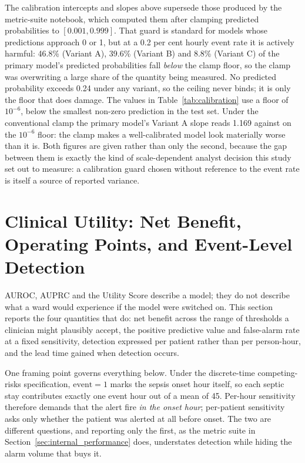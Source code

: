 The calibration intercepts and slopes above supersede those produced by the
metric-suite notebook, which computed them after clamping predicted
probabilities to $[0.001, 0.999]$. That guard is standard for models whose
predictions approach 0 or 1, but at a 0.2 per cent hourly event rate it is
actively harmful: 46.8\% (Variant A), 39.6\% (Variant B) and 8.8\% (Variant C)
of the primary model's predicted probabilities fall \emph{below} the clamp
floor, so the clamp was overwriting a large share of the quantity being
measured. No predicted probability exceeds 0.24 under any variant, so the
ceiling never binds; it is only the floor that does damage. The
values in Table~\ref{tab:calibration} use a floor of $10^{-6}$, below the
smallest non-zero prediction in the test set. Under the conventional clamp the primary
model's Variant A slope reads 1.169 against \pcCalibSlopePrimaryA{} on the
$10^{-6}$ floor: the clamp makes a well-calibrated model look materially
worse than it is. Both figures are given rather than only the second, because
the gap between them is exactly the kind of scale-dependent analyst decision
this study set out to measure: a calibration guard chosen without reference to
the event rate is itself a source of reported variance.



\section{Clinical Utility: Net Benefit, Operating Points, and Event-Level
    Detection}
\label{sec:clinical_utility}

AUROC, AUPRC and the Utility Score describe a model; they do not describe what
a ward would experience if the model were switched on. This section reports
the four quantities that do: net benefit across the range of thresholds a
clinician might plausibly accept, the positive predictive value and false-alarm
rate at a fixed sensitivity, detection expressed per patient rather than per
person-hour, and the lead time gained when detection occurs.

One framing point governs everything below. Under the discrete-time
competing-risks specification, $\text{event}=1$ marks the sepsis onset hour
itself, so each septic stay contributes exactly one event hour out of a mean
of 45. Per-hour sensitivity therefore demands that the alert fire \emph{in the
onset hour}; per-patient sensitivity asks only whether the patient was alerted
at all before onset. The two are different questions, and reporting only the
first, as the metric suite in Section~\ref{sec:internal_performance} does,
understates detection while hiding the alarm volume that buys it.

